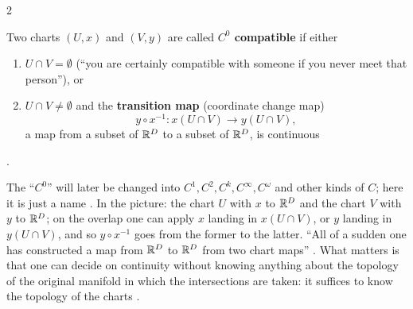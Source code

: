 \begin{paracol}{2}
\begin{definition}\label{def:mf-compat}
Two charts $(U,x)$ and $(V,y)$ are called \textbf{$C^0$ compatible} if either
\begin{enumerate}
  \item $U\cap V=\emptyset$ (``you are certainly compatible with someone if you never meet that person''), or
  \item $U\cap V\ne\emptyset$ and the \textbf{transition map} (coordinate change map)
        \[
          y\circ x^{-1}\colon x(U\cap V)\to y(U\cap V),
        \]
        a map from a subset of $\mathbb{R}^D$ to a subset of $\mathbb{R}^D$, is continuous
\end{enumerate}
.
\end{definition}
The ``$C^0$'' will later be changed into $C^1,C^2,C^k,C^\infty,C^\omega$ and other kinds of $C$; here it is just a name . In the picture: the chart $U$ with $x$ to $\mathbb{R}^D$ and the chart $V$ with $y$ to $\mathbb{R}^D$; on the overlap one can apply $x$ landing in
$x(U\cap V)$, or $y$ landing in $y(U\cap V)$, and so $y\circ x^{-1}$ goes from the former to the latter. ``All of a sudden one has constructed a map from $\mathbb{R}^D$ to $\mathbb{R}^D$ from two chart maps'' .
What matters is that one can decide on continuity without knowing anything about the topology of the original manifold in which the intersections are taken: it suffices to know the topology of the charts .


\end{paracol}
